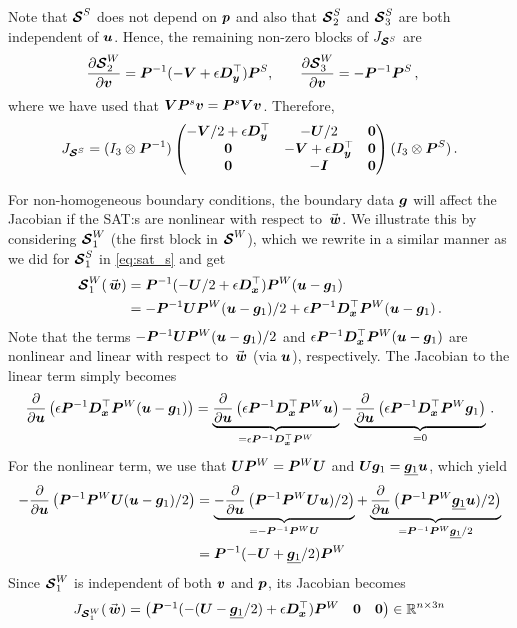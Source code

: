 Note that $\bm{\mathcal{S}}^S$ does not depend on $\bm{p}$ and also that $\bm{\mathcal{S}}_2^S$ and $\bm{\mathcal{S}}_3^S$ are both independent of $\bm{u}$. Hence, the remaining non-zero blocks of $J_{\bm{\mathcal{S}}^S}$ are
\begin{align*}
   \frac{\partial \bm{\mathcal{S}}^W_2}{\partial \bm{v}} &= \bm{P}^{-1}(-\bm{V} + \epsilon \bm{D_y}^\top)\bm{P}^S
   ,\quad  
   & \frac{\partial \bm{\mathcal{S}}_3^W}{\partial \bm{v}} & = -\bm{P}^{-1}\bm{P}^S
   \, ,
\end{align*}
where we have used that $\bm{V} \bm{P}^s \bm{v} = \bm{P}^s \bm{V} \bm{v}$. 
Therefore, 
\[
    J_{\bm{\mathcal{S}}^S} = 
    (I_3 \otimes \bm{P}^{-1})
    \begin{pmatrix}
        -\bm{V}/2 + \epsilon \bm{D_y}^\top & -\bm{U}/2 & \bm{0}
        \\
        \bm{0}  & -\bm{V} + \epsilon \bm{D_y}^\top & \bm{0}
        \\
        \bm{0} & -\bm{I} & \bm{0}
    \end{pmatrix}
    (I_3 \otimes \bm{P}^S)
    \, .
\]

For non-homogeneous boundary conditions, the boundary data $\bm{g}$ will affect the Jacobian if the SAT:s are nonlinear with respect to $\wn$. We illustrate this by considering $\bm{\mathcal{S}}^W_1$ (the first block in $\bm{\mathcal{S}}^W$), which we rewrite in a similar manner as we did for $\bm{\mathcal{S}}^S_1$ in \eqref{eq:sat_s} and get
\begin{align*}
 \satn^W_1(\wn) & =  \Pn^{-1}(-\Un/2 + \epsilon\Dx^\top)\Pn^W(\un - \gn_1)
 \\
  & = -\Pn^{-1}\Un\Pn^W(\un - \gn_1)/2 
  + \epsilon\Pn^{-1}\Dx^\top\Pn^W(\un - \gn_1)
             \, .
\end{align*}
Note that the terms $-\bm{P}^{-1}\bm{U}\bm{P}^W(\bm{u} - \bm{g}_1)/2$ and $\epsilon \bm{P}^{-1}\bm{D_x}^\top\bm{P}^W(\bm{u} - \bm{g}_1)$ are nonlinear and linear with respect to $\wn$ (via $\bm{u}$), respectively. The Jacobian to the linear term simply becomes
\begin{align*}
   \frac{\partial}{\partial \bm{u}}\left(\epsilon \bm{P}^{-1}\bm{D_x}^\top\bm{P}^W(\bm{u} - \bm{g}_1) \right) 
   = 
   \underbrace{
   \frac{\partial}{\partial \bm{u}}\left(\epsilon \bm{P}^{-1}\bm{D_x}^\top\bm{P}^W\bm{u}\right) 
   }_{= \epsilon \bm{P}^{-1}\bm{D_x}^\top\bm{P}^W}
   -
   \underbrace{
   \frac{\partial}{\partial \bm{u}}\left(\epsilon \bm{P}^{-1}\bm{D_x}^\top\bm{P}^W\bm{g}_1\right) 
   }_{ = 0}
   \, .
\end{align*}
For the nonlinear term, we use that $\bm{U} \bm{P}^W = \bm{P}^W \bm{U}$ and $\bm{U} \bm{g}_1 = \underline{\bm{g}_1}\bm{u}$, which yield
\begin{align*}
   -\frac{\partial}{\partial \bm{u}}\left(\bm{P}^{-1}\bm{P}^W\bm{U}(\bm{u} - \bm{g}_1)/2\right) 
   & = 
   \underbrace{
   -\frac{\partial}{\partial \bm{u}}\left(\bm{P}^{-1}\bm{P}^W\bm{U}\bm{u})/2\right)}_
   {= -\bm{P}^{-1}\bm{P}^W\bm{U}} 
   +
   \underbrace{
   \frac{\partial}{\partial \bm{u}}\left(\bm{P}^{-1}\bm{P}^W\underline{\bm{g}_1}\bm{u})/2\right)
   }_{=\bm{P}^{-1}\bm{P}^W \underline{\bm{g}_1}/2} 
   \\
   & = \bm{P}^{-1}(-\bm{U} + \underline{\bm{g}_1}/2)\bm{P}^W
\end{align*}
Since $\bm{\mathcal{S}}_1^W$ is independent of both $\bm{v}$ and $\bm{p}$, its Jacobian becomes
\[
   J_{\satn^W_1}(\wn) = 
   \begin{pmatrix}
     \Pn^{-1}(-(\Un - \diagn{\gn_1}/2) + \epsilon \Dx^\top)\Pn^W  
     & \zeron & \zeron
   \end{pmatrix}
   \in \Rbb^{n\times 3n}
\]


